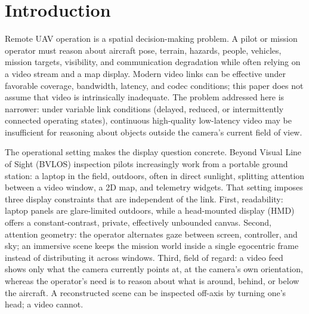 \documentclass[fleqn]{VRIH2025}
\begin{document}

\maketitle

\section{Introduction}

Remote UAV operation is a spatial decision-making problem. A pilot or mission operator must reason about aircraft pose, terrain, hazards, people, vehicles, mission targets, visibility, and communication degradation while often relying on a video stream and a map display. Modern video links can be effective under favorable coverage, bandwidth, latency, and codec conditions; this paper does not assume that video is intrinsically inadequate. The problem addressed here is narrower: under variable link conditions (delayed, reduced, or intermittently connected operating states), continuous high-quality low-latency video may be insufficient for reasoning about objects outside the camera's current field of view. 

The operational setting makes the display question concrete. Beyond Visual Line of Sight (BVLOS) inspection pilots increasingly work from a portable ground station: a laptop in the field, outdoors, often in direct sunlight, splitting attention between a video window, a 2D map, and telemetry widgets. That setting imposes three display constraints that are independent of the link. First, readability: laptop panels are glare-limited outdoors, while a head-mounted display (HMD) offers a constant-contrast, private, effectively unbounded canvas. Second, attention geometry: the operator alternates gaze between screen, controller, and sky; an immersive scene keeps the mission world inside a single egocentric frame instead of distributing it across windows. Third, field of regard: a video feed shows only what the camera currently points at, at the camera's own orientation, whereas the operator's need is to reason about what is around, behind, or below the aircraft. A reconstructed scene can be inspected off-axis by turning one's head; a video cannot.
\end{document}
